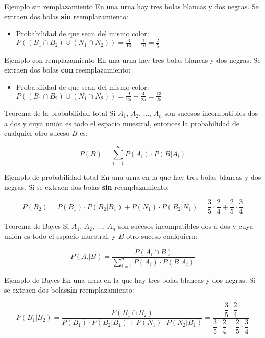 \documentclass[11pt]{beamer}
\begin{document}
\begin{frame}{Ejemplo sin remplazamiento}
En una urna hay tres bolas blancas y dos negras. Se extraen dos bolas \textbf{sin} reemplazamiento:

\begin{itemize}
\item Probabilidad de que sean del mismo color: \\
$P((B_1\cap B_2)\cup (N_1\cap N_2))=\frac{3}{10}+\frac{1}{10}=\frac{2}{5}$
\end{itemize}

\end{frame}

\begin{frame}{Ejemplo con remplazamiento}
En una urna hay tres bolas blancas y dos negras. Se extraen dos bolas \textbf{con} reemplazamiento:

\begin{itemize}
\item Probabilidad de que sean del mismo color: \\
$P((B_1\cap B_2)\cup (N_1\cap N_2))=\frac{9}{25}+\frac{4}{25}=\frac{13}{25}$
\end{itemize}

\end{frame}



\begin{frame}{Teorema de la probabilidad total}
Si $A_1$, $A_2$, ..., $A_n$   son sucesos incompatibles dos a dos y cuya unión es todo el espacio muestral, entonces la probabilidad de cualquier otro suceso $B$ es:

$$P(B)=\sum_{i=1}^n P(A_i)\cdot  P(B|A_i) $$
\end{frame}

\begin{frame}{Ejemplo de probabilidad total}
En una urna en la que hay tres bolas blancas y dos negras. Si se extraen dos bolas \textbf{sin} reemplazamiento:


$$P(B_2)=P(B_1)\cdot P(B_2|B_1) + P(N_1)\cdot P(B_2|N_1)
= \frac{3}{5}\cdot\frac{2}{4} + \frac{2}{5}\cdot\frac{3}{4}$$
\end{frame}


\begin{frame}{Teorema de Bayes}
Si $A_1$, $A_2$, ..., $A_n$   son sucesos incompatibles dos a dos y cuya unión es todo el espacio muestral, y $B$ otro suceso cualquiera:

$$P(A_i|B)=\dfrac{P(A_i \cap B)}{\sum_{i=1}^n P(A_i)\cdot  P(B|A_i)} $$

\end{frame}

\begin{frame}{Ejemplo de Bayes}
En una urna en la que hay tres bolas blancas y dos negras. Si se extraen dos bolas\textbf{sin} reemplazamiento:


$$P(B_1|B_2)=\dfrac{P(B_1 \cap B_2)}{P(B_1)\cdot  P(B_2|B_1)+P(N_1)\cdot  P(N_2|B_1)}=\dfrac{\dfrac{3}{5}\cdot\dfrac{2}{4}}{\dfrac{3}{5}\cdot\dfrac{2}{4} + \dfrac{2}{5}\cdot\dfrac{3}{4}}$$
\end{frame}
\end{document}
